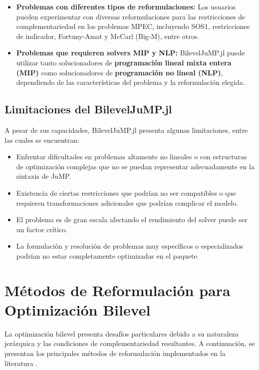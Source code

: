 \begin{itemize}
    \item \textbf{Problemas con diferentes tipos de reformulaciones:} Los usuarios pueden experimentar con diversas reformulaciones para las restricciones de complementariedad en los problemas MPEC, incluyendo SOS1, restricciones de indicador, Fortuny-Amat y McCarl (Big-M), entre otros.
    
    \item \textbf{Problemas que requieren solvers MIP y NLP:} BilevelJuMP.jl puede utilizar tanto solucionadores de \textbf{programación lineal mixta entera (MIP)} como solucionadores de \textbf{programación no lineal (NLP)}, dependiendo de las características del problema y la reformulación elegida.
\end{itemize}

\subsection{Limitaciones del BilevelJuMP.jl}

A pesar de sus capacidades, BilevelJuMP.jl presenta algunas limitaciones, entre las cuales se encuentran:

\begin{itemize}
    \item Enfrentar dificultades en problemas altamente no lineales o con estructuras de optimización complejas que no se puedan representar adecuadamente en la sintaxis de JuMP.
    \item Existencia de ciertas restricciones que podrían no ser compatibles o que requieren transformaciones adicionales que podrían complicar el modelo.
    \item El problema es de gran escala afectando el rendimiento del solver puede ser un factor crítico.
    \item La formulación y resolución de problemas muy específicos o especializados podrían no estar completamente optimizadas en el paquete.
\end{itemize}


\section{Métodos de Reformulación para Optimización Bilevel}

La optimización bilevel presenta desafíos particulares debido a su naturaleza jerárquica y las condiciones de complementariedad resultantes. A continuación, se presentan los principales métodos de reformulación implementados en la literatura \cite{BilevelJump}.

